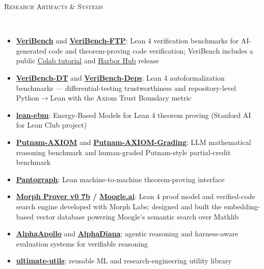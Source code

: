 \documentclass{article}
\newenvironment{changemargin}[2]{%
  \begin{list}{}{%
    \setlength{\topsep}{0pt}%
    \setlength{\leftmargin}{#1}%
    \setlength{\rightmargin}{#2}%
    \setlength{\listparindent}{\parindent}%
    \setlength{\itemindent}{\parindent}%
    \setlength{\parsep}{\parskip}%
  }%
  \item[]}{\end{list}
}
\newcommand{\lineover}{
	\begin{changemargin}{-0.05in}{-0.05in}
		\vspace*{-8pt}
		\hrulefill \\
		\vspace*{-2pt}
	\end{changemargin}
}
\newcommand{\header}[1]{
	\begin{changemargin}{-0.5in}{-0.5in}
		\scshape{#1}\\
  	\lineover
	\end{changemargin}
	\nopagebreak[4]    %
}
\newenvironment{body} {
		\vspace*{-16pt}
		\begin{changemargin}{-0.25in}{-0.5in}
	  }
		{\end{changemargin}\vspace{8pt plus 12pt}
	}
\begin{document}
\header{Research Artifacts \& Systems}

\begin{body}
	\vspace{12pt}
	\begin{itemize} \itemsep -2pt
		\item \textbf{\href{https://openreview.net/forum?id=rWkGFmnSNl}{VeriBench}} and \textbf{\href{https://openreview.net/forum?id=wDjOpXKgtU}{VeriBench-FTP}}: Lean 4 verification benchmarks for AI-generated code and theorem-proving code verification; VeriBench includes a public \href{https://colab.research.google.com/drive/1_TsBPSQTMrNK0WD2-qj5VpEYKTLuiUYc?usp=sharing}{Colab tutorial} and \href{https://harborframework.com/registry}{Harbor Hub} release
		\item \textbf{\href{https://github.com/brando90/veribench-inf}{VeriBench-DT}} and \textbf{\href{https://github.com/brando90/veribench-deps}{VeriBench-Deps}}: Lean 4 autoformalization benchmarks --- differential-testing trustworthiness and repository-level Python$\to$Lean with the Axiom Trust Boundary metric
		\item \textbf{\href{https://github.com/Stanford-AI-for-LEAN-Club/lean-ebm}{lean-ebm}}: Energy-Based Models for Lean 4 theorem proving (Stanford AI for Lean Club project)
		\item \textbf{\href{https://openreview.net/forum?id=kqj2Cn3Sxr}{Putnam-AXIOM}} and \textbf{\href{https://huggingface.co/datasets/3ricme/Putnam-AXIOM-Grading}{Putnam-AXIOM-Grading}}: LLM mathematical reasoning benchmark and human-graded Putnam-style partial-credit benchmark
		\item \textbf{\href{https://link.springer.com/chapter/10.1007/978-3-031-90643-5_6}{Pantograph}}: Lean machine-to-machine theorem-proving interface
		\item \textbf{\href{https://huggingface.co/morph-labs/morph-prover-v0-7b}{Morph Prover v0 7b} / \href{https://www.moogle.ai/}{Moogle.ai}}: Lean 4 proof model and verified-code search engine developed with Morph Labs; designed and built the embedding-based vector database powering Moogle's semantic search over Mathlib
		\item \textbf{\href{https://alphaapollo.org/}{AlphaApollo}} and \textbf{\href{https://github.com/tmlr-group/AlphaDiana}{AlphaDiana}}: agentic reasoning and harness-aware evaluation systems for verifiable reasoning
		\item \textbf{\href{https://github.com/brando90/ultimate-utils}{ultimate-utils}}: reusable ML and research-engineering utility library
	\end{itemize}
\end{body}
\end{document}
